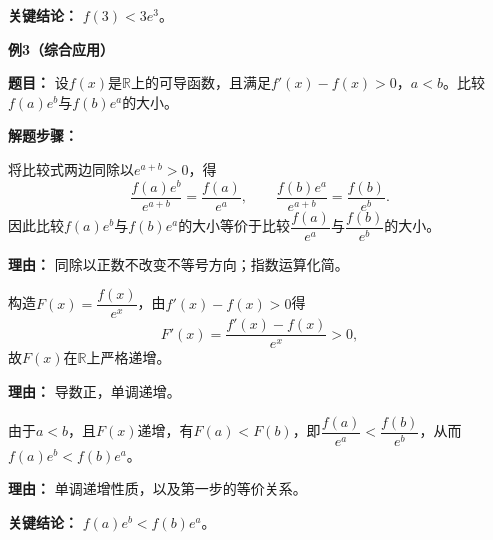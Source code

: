 \begin{examplebox}
	\textbf{\textcolor{CExample}{关键结论：}}
	\textbf{$f(3)<3e^3$}。

	\medskip
	\textbf{\textcolor{CExample}{例3（综合应用）}}

	\textbf{\textcolor{CExample}{题目：}}
	设$f(x)$是$\mathbb{R}$上的可导函数，且满足$f'(x)-f(x)>0$，$a<b$。比较$f(a)e^b$与$f(b)e^a$的大小。

	\textbf{\textcolor{CExample}{解题步骤：}}
	\begin{description}[style=nextline, leftmargin=2.8em, labelsep=0.5em, itemsep=0.45em]
		\item[\textbf{第一步（等价变形）：}] 将比较式两边同除以$e^{a+b}>0$，得
			\[
				\frac{f(a)e^b}{e^{a+b}}=\frac{f(a)}{e^a},
				\qquad
				\frac{f(b)e^a}{e^{a+b}}=\frac{f(b)}{e^b}.
			\]
			因此比较$f(a)e^b$与$f(b)e^a$的大小等价于比较$\dfrac{f(a)}{e^a}$与$\dfrac{f(b)}{e^b}$的大小。
			\par\textbf{理由：}
			同除以正数不改变不等号方向；指数运算化简。
		\item[\textbf{第二步（构造函数判单调）：}] 构造$F(x)=\dfrac{f(x)}{e^x}$，由$f'(x)-f(x)>0$得
			\[
				F'(x)=\frac{f'(x)-f(x)}{e^x}>0,
			\]
			故$F(x)$在$\mathbb{R}$上严格递增。
			\par\textbf{理由：}
			导数正，单调递增。
		\item[\textbf{第三步（单调性推结论）：}] 由于$a<b$，且$F(x)$递增，有$F(a)<F(b)$，即$\dfrac{f(a)}{e^a}<\dfrac{f(b)}{e^b}$，从而$f(a)e^b<f(b)e^a$。
			\par\textbf{理由：}
			单调递增性质，以及第一步的等价关系。
	\end{description}

	\textbf{\textcolor{CExample}{关键结论：}}
	\textbf{$f(a)e^b<f(b)e^a$}。
\end{examplebox}
